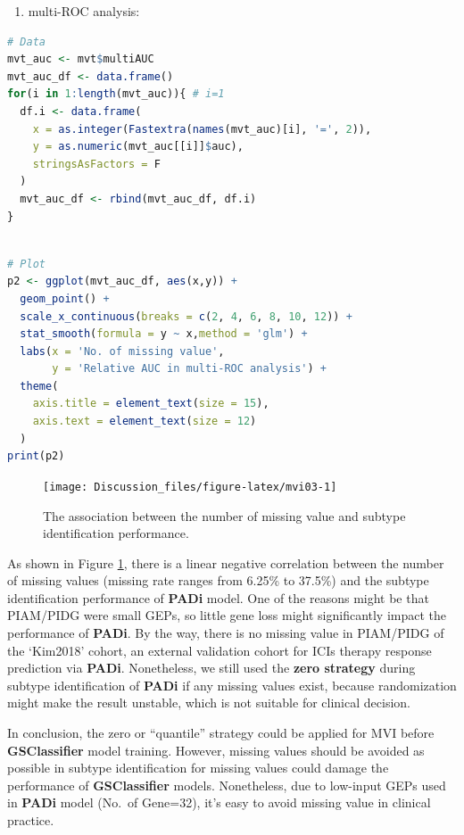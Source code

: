 \documentclass[
  12pt,
]{book}
\providecommand{\tightlist}{%
  \setlength{\itemsep}{0pt}\setlength{\parskip}{0pt}}
\begin{document}
\begin{enumerate}
\def\labelenumi{(\roman{enumi})}
\setcounter{enumi}{2}
\tightlist
\item
  multi-ROC analysis:
\end{enumerate}

\begin{lstlisting}[language=R]
# Data
mvt_auc <- mvt$multiAUC
mvt_auc_df <- data.frame()
for(i in 1:length(mvt_auc)){ # i=1
  df.i <- data.frame(
    x = as.integer(Fastextra(names(mvt_auc)[i], '=', 2)),
    y = as.numeric(mvt_auc[[i]]$auc),
    stringsAsFactors = F
  )
  mvt_auc_df <- rbind(mvt_auc_df, df.i)
}
  
\end{lstlisting}

\begin{lstlisting}[language=R]
# Plot
p2 <- ggplot(mvt_auc_df, aes(x,y)) +
  geom_point() +
  scale_x_continuous(breaks = c(2, 4, 6, 8, 10, 12)) + 
  stat_smooth(formula = y ~ x,method = 'glm') +
  labs(x = 'No. of missing value', 
       y = 'Relative AUC in multi-ROC analysis') +
  theme(
    axis.title = element_text(size = 15),
    axis.text = element_text(size = 12)
  )
print(p2)
\end{lstlisting}

\begin{figure}

{\centering \texttt{[image: Discussion\_files/figure-latex/mvi03-1]} 

}

\caption{The association between the number of missing value and subtype identification performance.}\label{fig:mvi03}
\end{figure}

As shown in Figure \ref{fig:mvi03}, there is a linear negative correlation between the number of missing values (missing rate ranges from 6.25\% to 37.5\%) and the subtype identification performance of \textbf{PADi} model. One of the reasons might be that PIAM/PIDG were small GEPs, so little gene loss might significantly impact the performance of \textbf{PADi}. By the way, there is no missing value in PIAM/PIDG of the `Kim2018' cohort, an external validation cohort for ICIs therapy response prediction via \textbf{PADi}. Nonetheless, we still used the \textbf{zero strategy} during subtype identification of \textbf{PADi} if any missing values exist, because randomization might make the result unstable, which is not suitable for clinical decision.

In conclusion, the zero or ``quantile'' strategy could be applied for MVI before \textbf{GSClassifier} model training. However, missing values should be avoided as possible in subtype identification for missing values could damage the performance of \textbf{GSClassifier} models. Nonetheless, due to low-input GEPs used in \textbf{PADi} model (No.~of Gene=32), it's easy to avoid missing value in clinical practice.
\end{document}
